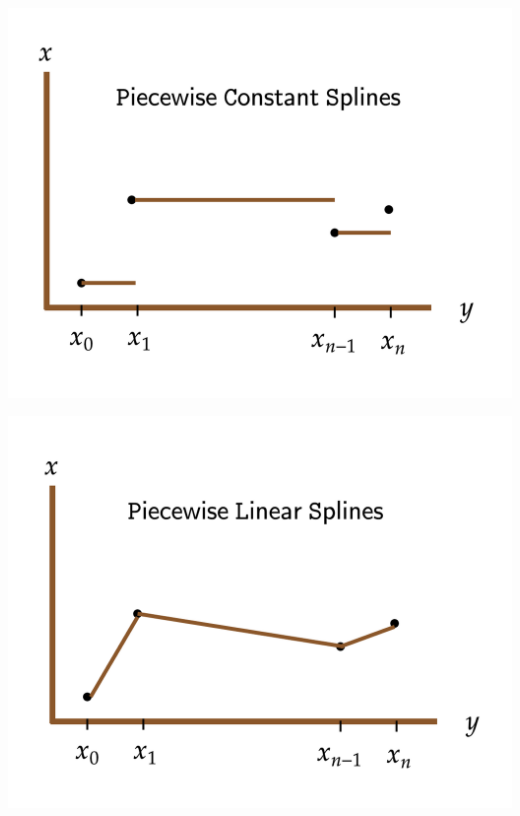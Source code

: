 \begin{marginfigure}
    \begin{center}
         \includegraphics[width=\textwidth]{figures/fig-16.png}
    \end{center}
    \begin{center}
           \includegraphics[width=\textwidth]{figures/fig-17.png}
    \end{center}
    \begin{center}

\end{center}
\end{marginfigure}
